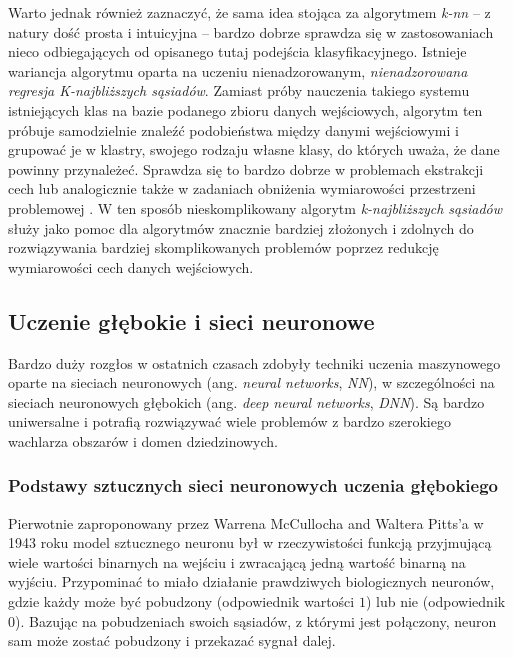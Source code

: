 \begin{itemize}
        Warto jednak również zaznaczyć, że sama idea stojąca za algorytmem \emph{k-nn} -- z natury dość prosta i intuicyjna -- bardzo dobrze sprawdza się w zastosowaniach nieco odbiegających od opisanego tutaj podejścia klasyfikacyjnego.
        Istnieje wariancja algorytmu oparta na uczeniu nienadzorowanym, \emph{nienadzorowana regresja K-najbliższych sąsiadów}.
        Zamiast próby nauczenia takiego systemu istniejących klas na bazie podanego zbioru danych wejściowych, algorytm ten próbuje samodzielnie znaleźć podobieństwa między danymi wejściowymi i grupować je w klastry, swojego rodzaju własne klasy, do których uważa, że dane powinny przynależeć.
        Sprawdza się to bardzo dobrze w problemach ekstrakcji cech lub analogicznie także w zadaniach obniżenia wymiarowości przestrzeni problemowej \cite{wang2015accelerating}.
        W ten sposób nieskomplikowany algorytm \emph{k-najbliższych sąsiadów} służy jako pomoc dla algorytmów znacznie bardziej złożonych i zdolnych do rozwiązywania bardziej skomplikowanych problemów poprzez redukcję wymiarowości cech danych wejściowych.

\end{itemize}

\subsection{Uczenie głębokie i sieci neuronowe}
\label{sec:deep-learning}

Bardzo duży rozgłos w ostatnich czasach zdobyły techniki uczenia maszynowego oparte na sieciach neuronowych (ang. \emph{neural networks}, \emph{NN}), w szczególności na sieciach neuronowych głębokich (ang. \emph{deep neural networks}, \emph{DNN}).
Są bardzo uniwersalne i potrafią rozwiązywać wiele problemów z bardzo szerokiego wachlarza obszarów i domen dziedzinowych.

\subsubsection{Podstawy sztucznych sieci neuronowych uczenia głębokiego}

Pierwotnie zaproponowany przez Warrena McCullocha and Waltera Pitts'a w 1943 roku \cite{mcculloch1943logical} model sztucznego neuronu był w rzeczywistości funkcją przyjmującą wiele wartości binarnych na wejściu i zwracającą jedną wartość binarną na wyjściu.
Przypominać to miało działanie prawdziwych biologicznych neuronów, gdzie każdy może być pobudzony (odpowiednik wartości $1$) lub nie (odpowiednik $0$).
Bazując na pobudzeniach swoich sąsiadów, z którymi jest połączony, neuron sam może zostać pobudzony i przekazać sygnał dalej.

